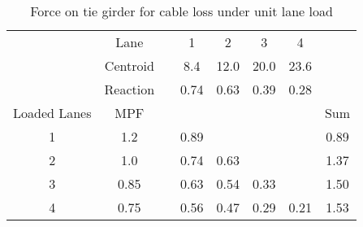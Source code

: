 \begin{table}[H]
\centering
\begin{tabular}{cccccccc}
\cline{2-7}
             & Lane     &  & 1    & 2    & 3    & 4    &      \\
             & Centroid &  & 8.4  & 12.0 & 20.0 & 23.6 &      \\
             & Reaction &  & 0.74 & 0.63 & 0.39 & 0.28 &      \\ \hline
Loaded Lanes & MPF      &  &      &      &      &      & Sum  \\ \hline
1            & 1.2      &  & 0.89 &      &      &      & 0.89 \\
2            & 1.0      &  & 0.74 & 0.63 &      &      & 1.37 \\
3            & 0.85     &  & 0.63 & 0.54 & 0.33 &      & 1.50 \\
4            & 0.75     &  & 0.56 & 0.47 & 0.29 & 0.21 & 1.53 \\ \hline
\end{tabular}
\caption{Force on tie girder for cable loss under unit lane load}
\label{tab:app_ll_cable_loss}
\end{table}
